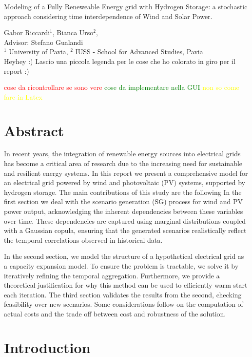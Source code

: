 \documentclass[english]{article}
\numberwithin{definition}{section}
\numberwithin{theorem}{section}
\numberwithin{problem}{section}
\begin{document}
\begin{center}
    

\LARGE{Modeling of a Fully Reneweable Energy grid with Hydrogen Storage: a stochastic approach considering time interdependence of Wind and Solar Power.} 
\end{center}
Gabor Riccardi$^1$, Bianca Urso$^2$, \\
Advisor: Stefano Gualandi \\
$^1$ University of Pavia, $^2$ IUSS - School for Advanced Studies, Pavia\\

Heyhey :) Lascio una piccola legenda per le cose che ho colorato in giro per il report :)

\textcolor{red}{cose da ricontrollare se sono vere}
\textcolor{green}{cose da implementare nella GUI}
\textcolor{yellow}{non so come fare in Latex}


\section*{Abstract}
    
In recent years, the integration of renewable energy sources into electrical grids has become a critical area of 
research due to the increasing need for sustainable and resilient energy systems. In this report we present a
 comprehensive model for an electrical grid powered by wind and photovoltaic (PV) systems, supported by hydrogen storage. 
The main contributions of this study are the following
In the first section we deal with the scenario generation (SG) process for wind and PV power output,
 acknowledging the inherent dependencies between these variables over time.
  These dependencies are captured using marginal distributions coupled with a Gaussian copula, ensuring that the generated scenarios realistically reflect the temporal correlations observed in historical data. 

In the second section, we model the structure of a hypothetical electrical grid as a capacity expansion model. To ensure the problem is tractable, we solve it by iteratively refining the temporal aggregation. Furthermore, we provide a theoretical justification for why this method can be used to efficiently warm start each iteration.
The third section validates the results from the second, checking feasibility over new scenarios. Some considerations follow on the computation of actual costs and the trade off between cost and robustness of the solution.

\section*{Introduction}
\end{document}
